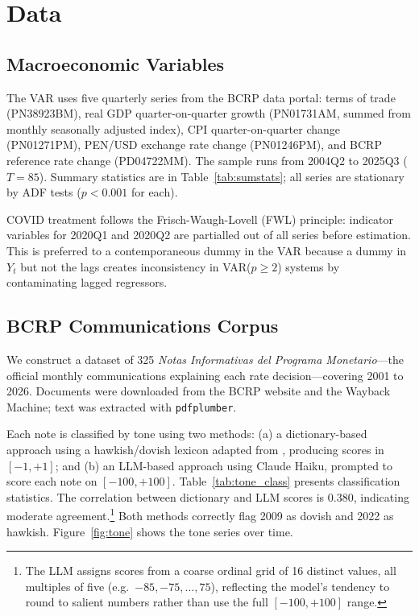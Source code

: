 \documentclass[12pt,letterpaper]{article}
\begin{document}
\section{Data}
\label{sec:data}

\subsection{Macroeconomic Variables}

The VAR uses five quarterly series from the BCRP data portal: terms of
trade (PN38923BM), real GDP quarter-on-quarter growth (PN01731AM,
summed from monthly seasonally adjusted index), CPI quarter-on-quarter
change (PN01271PM), PEN/USD exchange rate change (PN01246PM), and BCRP
reference rate change (PD04722MM). The sample runs from 2004Q2 to 2025Q3
($T=85$). Summary statistics are in Table~\ref{tab:sumstats}; all series
are stationary by ADF tests ($p<0.001$ for each).

COVID treatment follows the Frisch-Waugh-Lovell (FWL) principle: indicator
variables for 2020Q1 and 2020Q2 are partialled out of all series before
estimation. This is preferred to a contemporaneous dummy in the VAR because
a dummy in $Y_t$ but not the lags creates inconsistency in VAR($p\geq2$)
systems by contaminating lagged regressors.

\subsection{BCRP Communications Corpus}

We construct a dataset of 325 \textit{Notas Informativas del Programa
Monetario}---the official monthly communications explaining each rate
decision---covering 2001 to 2026. Documents were downloaded from the BCRP
website and the Wayback Machine; text was extracted with \texttt{pdfplumber}.

Each note is classified by tone using two methods: (a) a dictionary-based
approach using a hawkish/dovish lexicon adapted from \citet{lahura2020},
producing scores in $[-1,+1]$; and (b) an LLM-based approach using Claude
Haiku, prompted to score each note on $[-100,+100]$. Table~\ref{tab:tone_class}
presents classification statistics. The correlation between dictionary and
LLM scores is $0.380$, indicating moderate agreement.\footnote{The LLM
  assigns scores from a coarse ordinal grid of 16 distinct values, all
  multiples of five (e.g.\ $-85, -75, \ldots, 75$), reflecting the
  model's tendency to round to salient numbers rather than use the full
  $[-100, +100]$ range.} Both methods
correctly flag 2009 as dovish and 2022 as hawkish. Figure~\ref{fig:tone}
shows the tone series over time.
\end{document}
